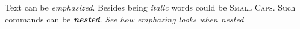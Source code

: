 \documentclass{article}
\begin{document}
Text can be \emph{emphasized}.
Besides being \textit{italic} words could be \textsc{Small Caps}.
Such commands can be \textit{\textbf{nested}}.
\emph{See how \emph{emphazing} looks when nested}
\end{document}
